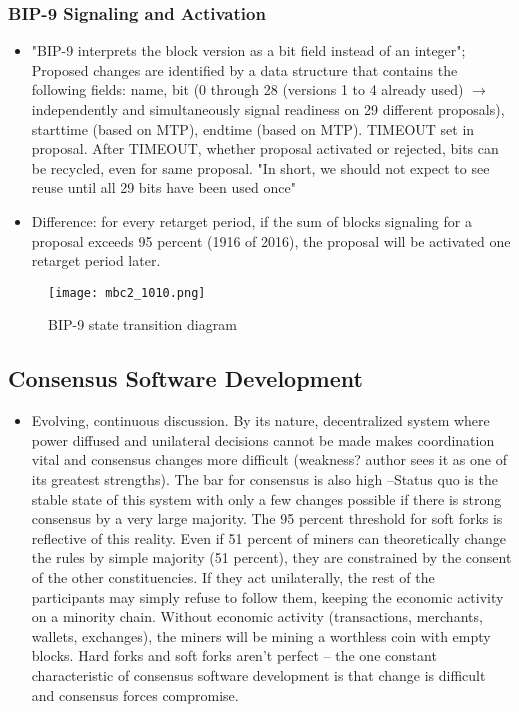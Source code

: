 \documentclass[english, 11pt]{article}
\begin{document}
\subsubsection{BIP-9 Signaling and Activation}
\begin{itemize}
    \item "BIP-9 interprets the block version as a bit field instead of an integer"; Proposed changes are identified by a data structure that contains the following fields: name, bit (0 through 28 (versions 1 to 4 already used) $\rightarrow$ independently and simultaneously signal readiness on 29 different proposals), starttime (based on MTP), endtime (based on MTP). TIMEOUT set in proposal. After TIMEOUT, whether proposal activated or rejected, bits can be recycled, even for same proposal. "In short, we should not expect to see reuse until all 29 bits have been used once"
    \item Difference: for every retarget period, if the sum of blocks signaling for a proposal exceeds 95 percent (1916 of 2016), the proposal will be activated one retarget period later.
\end{itemize}
\begin{figure}[H]
    \centering
    \texttt{[image: mbc2\_1010.png]}
    \caption{BIP-9 state transition diagram}
    \label{fig:my_label}
\end{figure}

\subsection{Consensus Software Development}
\begin{itemize}
    \item Evolving, continuous discussion. By its nature, decentralized system where power diffused and unilateral decisions cannot be made makes coordination vital and consensus changes more difficult (weakness? author sees it as one of its greatest strengths). The bar for consensus is also high --Status quo is the stable state of this system with only a few changes possible if there is strong consensus by a very large majority. The 95 percent threshold for soft forks is reflective of this reality. Even if 51 percent of miners can theoretically change the rules by simple majority (51 percent), they are constrained by the consent of the other constituencies. If they act unilaterally, the rest of the participants may simply refuse to follow them, keeping the economic activity on a minority chain. Without economic activity (transactions, merchants, wallets, exchanges), the miners will be mining a worthless coin with empty blocks. Hard forks and soft forks aren't perfect -- the one constant characteristic of consensus software development is that change is difficult and consensus forces compromise.
\end{itemize}
\end{document}
